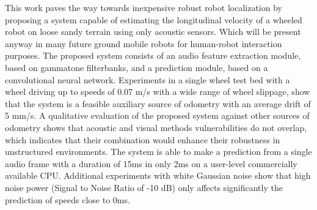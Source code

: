 This work paves the way towards inexpensive robust robot localization by proposing a system capable of estimating the longitudinal velocity of a wheeled robot on loose sandy terrain using only acoustic sensors. Which will be present anyway in many future ground mobile robots for human-robot interaction purposes. The proposed system consists of an audio feature extraction module, based on gammatone filterbanks, and a prediction module, based on a convolutional neural network. Experiments in a single wheel test bed with a wheel driving up to speeds of 0.07 m/s with a wide range of wheel slippage, show that the system is a feasible auxiliary source of odometry with an average drift of 5 mm/s. A qualitative evaluation of the proposed system against other sources of odometry shows that acoustic and visual methods vulnerabilities do not overlap, which indicates that their combination would enhance their robustness in unstructured environments. The system is able to make a prediction from a single audio frame with a duration of 15ms in only 2ms on a user-level commercially available CPU. Additional experiments with white Gaussian noise show that high noise power (Signal to Noise Ratio of -10 dB) only affects significantly the prediction of speeds close to 0ms.